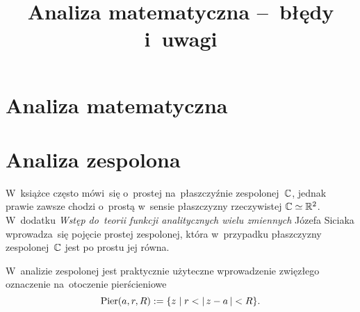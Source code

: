 \documentclass[a4paper,11pt]{article}
\title{Analiza matematyczna --~błędy i~uwagi}
\begin{document}



\maketitle  %



\section{Analiza matematyczna}

\vspace{\spaceTwo}











\newpage
\section{Analiza zespolona}

\vspace{\spaceTwo}






\start W~książce często mówi~się o~prostej na~płaszczyźnie
zespolonej~$\mathbb{C}$, jednak prawie zawsze chodzi o~prostą w~sensie
płaszczyzny rzeczywistej $\mathbb{C} \simeq \mathbb{R}^{ 2 }$. W~dodatku \textit{Wstęp
  do~teorii funkcji analitycznych wielu zmiennych} Józefa Siciaka
wprowadza~się pojęcie prostej zespolonej, która w~przypadku
płaszczyzny zespolonej~$\mathbb{C}$ jest po prostu jej równa.

\vspace{\spaceFour}



\start W~analizie zespolonej jest praktycznie użyteczne wprowadzenie
zwięzłego oznaczenie na~otoczenie pierścieniowe
\begin{equation}
  \label{eq:Leja-01}
  \textrm{Pier}(a, r, R) := \{ z \;|\; r < |\, {  z - a  } \,| < R \}.
\end{equation}
\end{document}
